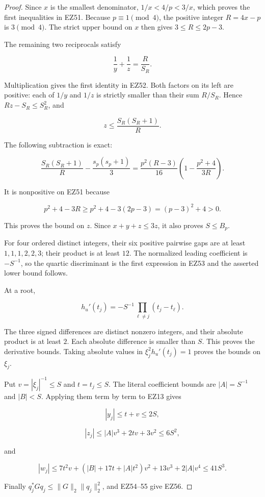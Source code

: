 \begin{proof}
Since \(x\) is the smallest denominator,
\(1/x<4/p<3/x\), which proves the first inequalities in EZ51.  Because
\(p\equiv1\pmod4\), the positive integer \(R=4x-p\) is \(3\pmod4\).
The strict upper bound on \(x\) then gives \(3\le R\le2p-3\).

The remaining two reciprocals satisfy

\[
 \frac1y+\frac1z=\frac{R}{S_R}.
\]

Multiplication gives the first identity in EZ52.  Both factors on its left
are positive: each of \(1/y\) and \(1/z\) is strictly smaller than their sum
\(R/S_R\).  Hence \(Rz-S_R\le S_R^2\), and

\[
 z\le\frac{S_R(S_R+1)}R.
\]

The following subtraction is exact:

\[
 \frac{S_R(S_R+1)}R-\frac{s_p(s_p+1)}3
 =\frac{p^2(R-3)}{16}
   \left(1-\frac{p^2+4}{3R}\right).
\]

It is nonpositive on EZ51 because

\[
 p^2+4-3R\ge p^2+4-3(2p-3)=(p-3)^2+4>0.
\]

This proves the bound on \(z\).  Since \(x+y+z\le3z\), it also proves
\(S\le B_p\).

For four ordered distinct integers, their six positive pairwise gaps are at
least \(1,1,1,2,2,3\); their product is at least \(12\).  The normalized
leading coefficient is \(-S^{-1}\), so the quartic discriminant is the first
expression in EZ53 and the asserted lower bound follows.

At a root,

\[
 h_u'(t_j)=-S^{-1}\prod_{\ell\ne j}(t_j-t_\ell).
\]

The three signed differences are distinct nonzero integers, and their
absolute product is at least \(2\).  Each absolute difference is smaller
than \(S\).  This proves the derivative bounds.  Taking absolute values in
\(\xi_j^2h_u'(t_j)=1\) proves the bounds on \(\xi_j\).

Put \(v=|\xi_j|^{-1}\le S\) and \(t=t_j\le S\).  The literal coefficient
bounds are \(|A|=S^{-1}\) and \(|B|<S\).  Applying them term by term to EZ13
gives

\[
 |y_j|\le t+v\le2S,
\]

\[
 |z_j|\le |A|v^3+2tv+3v^2\le6S^2,
\]

and

\[
 |w_j|\le7t^2v+(|B|+17t+|A|t^2)v^2+13v^3+2|A|v^4
 \le41S^3.
\]

Finally \(q_j^*Gq_j\le\|G\|_2\|q_j\|_2^2\), and EZ54--55 give EZ56.
\end{proof}

